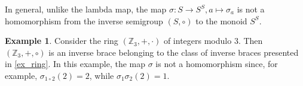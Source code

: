\documentclass[preprint,1p]{elsarticle}
\newtheorem{prop}[theor]{Proposition}
\theoremstyle{definition}               %
\newtheorem{ex}[theor]{Example}
\begin{document}




\smallskip




In general, unlike the lambda map, the map $\sigma: S \to S^S, a \mapsto \sigma_a$ is not a homomorphism from the inverse semigroup $(S, \circ)$ to the monoid $S^S$. 
\begin{ex}\label{nhomo}
        Consider the ring  $\left(\mathbb{Z}_3,+,\cdot \right)$ of integers modulo $3$.
        Then $\left(\mathbb{Z}_3,+, \circ\right)$ is an inverse brace belonging to the class of inverse braces presented in \cref{ex_ring}. 
In this example, the map $\sigma$ is not a homomorphism since, for example, 
$\sigma_{1 \circ 2}(2)=2$, while $\sigma_{1}\sigma_2(2)=1$.
\end{ex}


\smallskip
\end{document}
